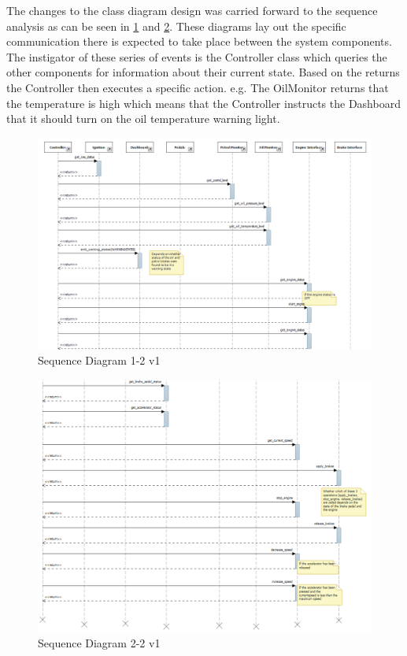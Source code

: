 \documentclass[12pt]{article}
\begin{document}
The changes to the class diagram design was carried forward to the sequence analysis as can be seen in \ref{fig:seq1} and \ref{fig:seq2}. These diagrams lay out the specific communication there is expected to take place between the system components. The instigator of these series of events is the Controller class which queries the other components for information about their current state. Based on the returns the Controller then executes a specific action. e.g. The OilMonitor returns that the temperature is high which means that the Controller instructs the Dashboard that it should turn on the oil temperature warning light. 

\begin{landscape}
	\begin{figure}[H]
		\includegraphics[width=1.2\textwidth]{sequence_diagram_v1}
		\caption{Sequence Diagram 1-2 v1}
		\label{fig:seq1}
	\end{figure}
\end{landscape}

\begin{landscape}
	\begin{figure}[H]
		\includegraphics[width=1.2\textwidth]{sequence_diagram_v2}
		\caption{Sequence Diagram 2-2 v1}
		\label{fig:seq2}
	\end{figure}
\end{landscape}
\end{document}
